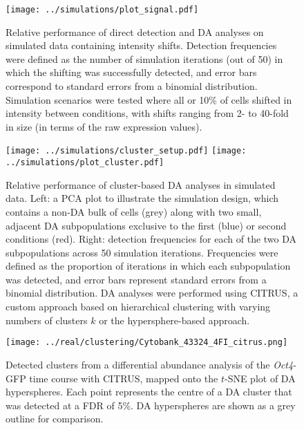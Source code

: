 \documentclass{article}
\begin{document}
\begin{figure}[p]
    \begin{center}
        \texttt{[image: ../simulations/plot\_signal.pdf]}
    \end{center}
    \caption{Relative performance of direct detection and DA analyses on simulated data containing intensity shifts.
        Detection frequencies were defined as the number of simulation iterations (out of 50) in which the shifting was successfully detected,
        and error bars correspond to standard errors from a binomial distribution.
        Simulation scenarios were tested where all or 10\% of cells shifted in intensity between conditions,
        with shifts ranging from 2- to 40-fold in size (in terms of the raw expression values).
    }
    \label{fig:shiftsim}
\end{figure}

\begin{figure}[p]
\begin{center}
\texttt{[image: ../simulations/cluster\_setup.pdf]}
\texttt{[image: ../simulations/plot\_cluster.pdf]}
\end{center}
\caption{Relative performance of cluster-based DA analyses in simulated data.
    Left: a PCA plot to illustrate the simulation design, which contains a non-DA bulk of cells (grey) along with two small, adjacent DA subpopulations exclusive to the first (blue) or second conditions (red).
    Right: detection frequencies for each of the two DA subpopulations across 50 simulation iterations.
    Frequencies were defined as the proportion of iterations in which each subpopulation was detected, and error bars represent standard errors from a binomial distribution.
    DA analyses were performed using CITRUS, a custom approach based on hierarchical clustering with varying numbers of clusters $k$ or the hypersphere-based approach.
}
\label{fig:clustersim}
\end{figure}

\begin{figure}[p]
\begin{center}
\texttt{[image: ../real/clustering/Cytobank\_43324\_4FI\_citrus.png]}
\end{center}
\caption{Detected clusters from a differential abundance analysis of the \textit{Oct4}-GFP time course with CITRUS, mapped onto the $t$-SNE plot of DA hyperspheres.
Each point represents the centre of a DA cluster that was detected at a FDR of 5\%.
DA hyperspheres are shown as a grey outline for comparison.
}
\label{fig:clusterreal}
\end{figure}
\end{document}
